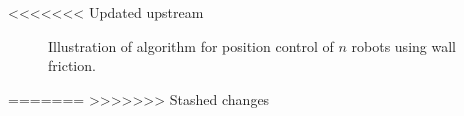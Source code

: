 <<<<<<< Updated upstream
\begin{figure}
\begin{center}
\end{center}
\caption{\label{fig:construction2d}
Illustration of algorithm for position control of $n$ robots using wall friction.
}
\end{figure}
=======
>>>>>>> Stashed changes














